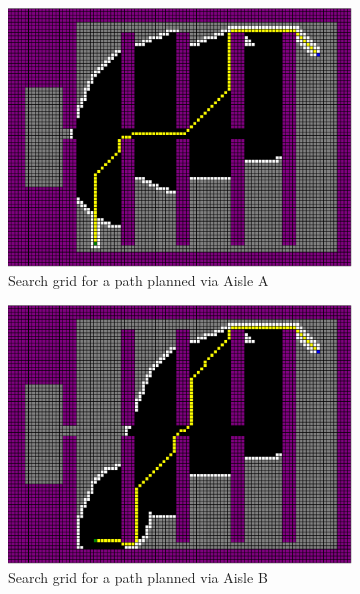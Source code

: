 \documentclass[a4paper,12pt]{article}
\begin{document}
			\begin{figure}[htp]
				\centering
				\begin{subfigure}{.45\textwidth}
					\centering
					\includegraphics[width=\textwidth]{../exports/initial_search_grid_aisleA}
					\caption{Search grid for a path planned via Aisle A}
					\label{fig:searchGridAisleA}
				\end{subfigure}
				\begin{subfigure}{.45\textwidth}
					\centering
					\includegraphics[width=\textwidth]{../exports/initial_search_grid_aisleB}
					\caption{Search grid for a path planned via Aisle B}
					\label{fig:searchGridAisleB}
				\end{subfigure}
				\begin{subfigure}{.45\textwidth}

\end{subfigure}
\end{figure}
\end{document}
